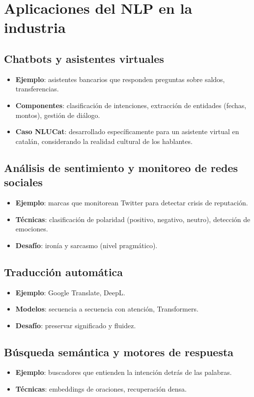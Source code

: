 \documentclass[12pt,a4paper,openany,oneside]{book}
\begin{document}
\section{Aplicaciones del NLP en la industria}

\subsection{Chatbots y asistentes virtuales}
\begin{itemize}
    \item \textbf{Ejemplo}: asistentes bancarios que responden preguntas sobre saldos, transferencias.
    \item \textbf{Componentes}: clasificación de intenciones, extracción de entidades (fechas, montos), gestión de diálogo.
    \item \textbf{Caso NLUCat}: desarrollado específicamente para un asistente virtual en catalán, considerando la realidad cultural de los hablantes.
\end{itemize}

\subsection{Análisis de sentimiento y monitoreo de redes sociales}
\begin{itemize}
    \item \textbf{Ejemplo}: marcas que monitorean Twitter para detectar crisis de reputación.
    \item \textbf{Técnicas}: clasificación de polaridad (positivo, negativo, neutro), detección de emociones.
    \item \textbf{Desafío}: ironía y sarcasmo (nivel pragmático).
\end{itemize}

\subsection{Traducción automática}
\begin{itemize}
    \item \textbf{Ejemplo}: Google Translate, DeepL.
    \item \textbf{Modelos}: secuencia a secuencia con atención, Transformers.
    \item \textbf{Desafío}: preservar significado y fluidez.
\end{itemize}

\subsection{Búsqueda semántica y motores de respuesta}
\begin{itemize}
    \item \textbf{Ejemplo}: buscadores que entienden la intención detrás de las palabras.
    \item \textbf{Técnicas}: embeddings de oraciones, recuperación densa.
\end{itemize}
\end{document}
